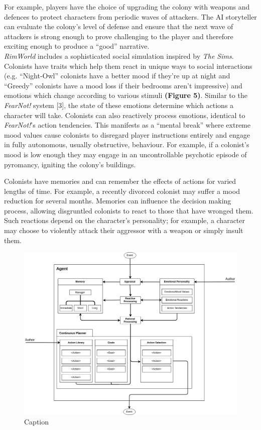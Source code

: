 \documentclass{sig-alternate-05-2015}
\begin{document}
For example, players have the choice of upgrading the colony with weapons and defences to protect characters from periodic waves of attackers. The AI storyteller can evaluate the colony's level of defense and ensure that the next wave of attackers is strong enough to prove challenging to the player and therefore exciting enough to produce a ``good'' narrative.\\

\textit{RimWorld} includes a sophisticated social simulation inspired by \textit{The Sims}. Colonists have traits which help them react in unique ways to social interactions (e.g. ``Night-Owl'' colonists have a better mood if they're up at night and ``Greedy'' colonists have a mood loss if their bedrooms aren't impressive) and emotions which change according to various stimuli \textbf{(Figure 5)}. Similar to the \textit{FearNot!} system [3], the state of these emotions determine which actions a character will take. Colonists can also reactively process emotions, identical to \textit{FearNot!}'s action tendencies. This manifests as a ``mental break'' where extreme mood values cause colonists to disregard player instructions entirely and engage in fully autonomous, usually obstructive, behaviour. For example, if a colonist's mood is low enough they may engage in an uncontrollable psychotic episode of pyromancy, igniting the colony's buildings.

Colonists have memories and can remember the effects of actions for varied lengths of time. For example, a recently divorced colonist may suffer a mood reduction for several months. Memories can influence the decision making process, allowing disgruntled colonists to react to those that have wronged them. Such reactions depend on the character's personality; for example, a character may choose to violently attack their aggressor with a weapon or simply insult them.

\begin{figure}[!b]
\centering
\includegraphics[scale=0.4]{Images/AgentArchitecture.png}
\caption{Caption}
\end{figure}
\end{document}
